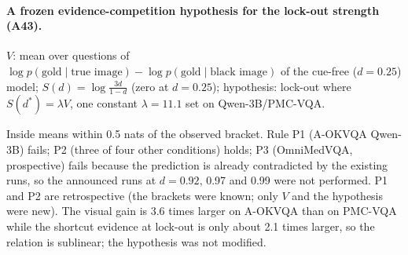 \paragraph{A frozen evidence-competition hypothesis for the lock-out strength (A43).}
$V$: mean over questions of $\log p(\text{gold}\mid\text{true image})-\log p(\text{gold}\mid\text{black image})$ of the cue-free ($d=0.25$) model; $S(d)=\log\frac{3d}{1-d}$ (zero at $d=0.25$); hypothesis: lock-out where $S(d^\ast)=\lambda V$, one constant $\lambda=11.1$ set on Qwen-3B/PMC-VQA.
\begin{center}
\footnotesize
\setlength{\tabcolsep}{3pt}
\end{center}
Inside means within 0.5 nats of the observed bracket. Rule P1 (A-OKVQA Qwen-3B) fails; P2 (three of four other conditions) holds; P3 (OmniMedVQA, prospective) fails because the prediction is already contradicted by the existing runs, so the announced runs at $d=0.92$, 0.97 and 0.99 were not performed.
P1 and P2 are retrospective (the brackets were known; only $V$ and the hypothesis were new).
The visual gain is 3.6 times larger on A-OKVQA than on PMC-VQA while the shortcut evidence at lock-out is only about 2.1 times larger, so the relation is sublinear; the hypothesis was not modified.

